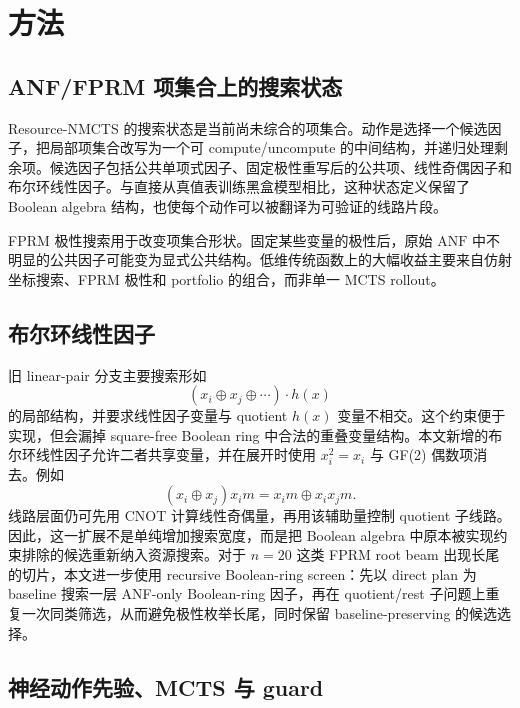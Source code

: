 \documentclass[UTF8,fontset=macnew,11pt]{ctexart}
\newcommand{\method}{Resource-NMCTS}
\newcommand{\anf}{\ensuremath{\mathrm{ANF}}}
\begin{document}
\section{方法}

\subsection{ANF/FPRM 项集合上的搜索状态}

\method{} 的搜索状态是当前尚未综合的项集合。动作是选择一个候选因子，把局部项集合改写为一个可 compute/uncompute 的中间结构，并递归处理剩余项。候选因子包括公共单项式因子、固定极性重写后的公共项、线性奇偶因子和布尔环线性因子。与直接从真值表训练黑盒模型相比，这种状态定义保留了 Boolean algebra 结构，也使每个动作可以被翻译为可验证的线路片段。

FPRM 极性搜索用于改变项集合形状。固定某些变量的极性后，原始 \anf{} 中不明显的公共因子可能变为显式公共结构。低维传统函数上的大幅收益主要来自仿射坐标搜索、FPRM 极性和 portfolio 的组合，而非单一 MCTS rollout。

\subsection{布尔环线性因子}

旧 linear-pair 分支主要搜索形如
\begin{equation}
  (x_i\oplus x_j\oplus\cdots)\cdot h(x)
  \label{eq:linear_factor}
\end{equation}
的局部结构，并要求线性因子变量与 quotient $h(x)$ 变量不相交。这个约束便于实现，但会漏掉 square-free Boolean ring 中合法的重叠变量结构。本文新增的布尔环线性因子允许二者共享变量，并在展开时使用 $x_i^2=x_i$ 与 GF(2) 偶数项消去。例如
\begin{equation}
  (x_i\oplus x_j)x_i m = x_i m \oplus x_i x_j m .
  \label{eq:boolean_ring}
\end{equation}
线路层面仍可先用 CNOT 计算线性奇偶量，再用该辅助量控制 quotient 子线路。因此，这一扩展不是单纯增加搜索宽度，而是把 Boolean algebra 中原本被实现约束排除的候选重新纳入资源搜索。对于 $n=20$ 这类 FPRM root beam 出现长尾的切片，本文进一步使用 recursive Boolean-ring screen：先以 direct plan 为 baseline 搜索一层 ANF-only Boolean-ring 因子，再在 quotient/rest 子问题上重复一次同类筛选，从而避免极性枚举长尾，同时保留 baseline-preserving 的候选选择。

\subsection{神经动作先验、MCTS 与 guard}
\end{document}
